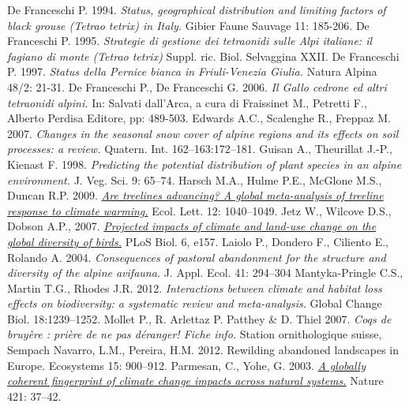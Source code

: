 \documentclass[10pt,twoside,openany,x11names,svgnames,italian,a5paper,dvipsnames,table]{memoir}
\begin{document}
\begin{thebibliography}{9}
De Franceschi P. 1994. \emph{Status, geographical distribution and limiting factors of black grouse (\emph{Tetrao tetrix}) in Italy.} Gibier Faune Sauvage 11: 185-206.
De Franceschi P. 1995. \emph{Strategie di gestione dei tetraonidi sulle Alpi italiane: il fagiano di monte (\emph{Tetrao tetrix})} Suppl. ric. Biol. Selvaggina XXII.
De Franceschi P. 1997. \emph{Status della Pernice bianca in Friuli-Venezia Giulia.} Natura Alpina 48/2: 21-31.
De Franceschi P., De Franceschi G. 2006. \emph{Il Gallo cedrone ed altri tetraonidi alpini.} In: Salvati dall'Arca, a cura di Fraissinet M., Petretti F., Alberto Perdisa Editore, pp: 489-503.
Edwards A.C., Scalenghe R., Freppaz M. 2007. \emph{Changes in the seasonal snow cover of alpine regions and its effects on soil processes: a review.} Quatern. Int. 162–163:172–181.
Guisan A., Theurillat J.-P., Kienast F. 1998. \emph{Predicting the potential distribution of plant species in an alpine environment.} J. Veg. Sci. 9: 65–74.
Harsch M.A., Hulme P.E., McGlone M.S., Duncan R.P. 2009. \href{http://www.geooek.uni-bayreuth.de/geooek/bsc/en/lehre/html/85896/Harsch_et_al_2009_treeline_climatechange.pdf}{\emph{Are treelines advancing? A global meta-analysis of treeline response to climate warming.}} Ecol. Lett. 12: 1040–1049.
Jetz W., Wilcove D.S., Dobson A.P., 2007. \href{http://www.plosbiology.org/article/fetchObject.action?uri=info%3Adoi%2F10.1371%2Fjournal.pbio.0050157&representation=PDF}{\emph{Projected impacts of climate and land-use change on the global diversity of birds.}} PLoS Biol. 6, e157. 
Laiolo P., Dondero F., Ciliento E., Rolando A. 2004. \emph{Consequences of pastoral abandonment for the structure and diversity of the alpine avifauna.} J. Appl. Ecol. 41: 294–304
Mantyka-Pringle C.S., Martin T.G., Rhodes J.R. 2012. \emph{Interactions between climate and habitat loss effects on biodiversity: a systematic review and meta-analysis.} Global Change Biol. 18:1239–1252.
Mollet P., R. Arlettaz P. Patthey \& D. Thiel 2007. \emph{Coqs de bruyère : prière de ne pas déranger! Fiche info.} Station ornithologique suisse, Sempach
Navarro, L.M., Pereira, H.M. 2012. Rewilding abandoned landscapes in Europe. Ecosystems 15: 900–912.
Parmesan, C., Yohe, G. 2003. \href{http://stephenschneider.stanford.edu/Publications/PDF_Papers/ParmesanYohe2003.pdf}{\emph{A globally coherent fingerprint of climate change impacts across natural systems.}} Nature 421: 37–42.

\end{thebibliography}
\end{document}
